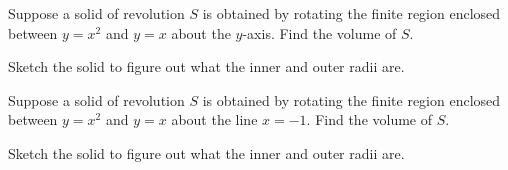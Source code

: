 \documentclass[../main.tex]{subfiles}
\begin{document}
\begin{example}
  Suppose a solid of revolution \(S\) is obtained by rotating the finite region enclosed between \(y = x^{2}\) and \(y = x\) about the \(y\)-axis.  Find the volume of \(S\).


  Sketch the solid to figure out what the inner and outer radii are.

  \begin{center}
    
  \end{center}

\end{example}
\clearpage

\begin{example}
  Suppose a solid of revolution \(S\) is obtained by rotating the finite region enclosed between \(y = x^{2}\) and \(y = x\) about the line \(x = -1\).  Find the volume of \(S\).

  Sketch the solid to figure out what the inner and outer radii are.

  \begin{center}
    
  \end{center}

\end{example}
\end{document}
